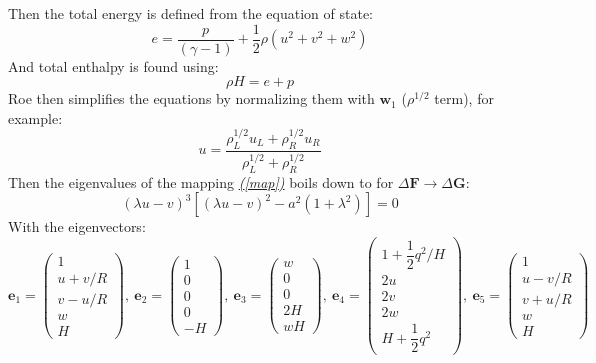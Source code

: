 \documentclass[a4paper, 12pt]{article}
\begin{document}
Then the total energy is defined from the equation of state:
\begin{equation}
    e = \dfrac{p}{(\gamma-1)}+\dfrac{1}{2}\rho(u^2+v^2+w^2)
\end{equation}
And total enthalpy is found using:
\begin{equation}
    \rho H= e+p
\end{equation}
Roe then simplifies the equations by normalizing them with $\textbf{w}_1$ ($\rho^{1/2}$ term), for example:
\begin{equation}
    u = \dfrac{\rho_L^{1/2}u_L+\rho_R^{1/2}u_R}{\rho_L^{1/2}+\rho_R^{1/2}}
\end{equation}
Then the eigenvalues of the mapping \hyperref[map]{\textit{(\autoref{map})}} boils down to for $\Delta\textbf{F}\rightarrow{}\Delta\textbf{G}$:
\begin{equation}
    (\lambda u-v)^3[(\lambda u-v)^2-a^2(1+\lambda^2)] = 0
\end{equation}
With the eigenvectors:
\begin{equation}
    \textbf{e}_1=\begin{pmatrix}
        1\\u+v/R\\v-u/R\\w\\H
    \end{pmatrix},\:
    \textbf{e}_2=\begin{pmatrix}
        1\\0\\0\\0\\-H
    \end{pmatrix},\:
    \textbf{e}_3=\begin{pmatrix}
        w\\0\\0\\2H\\wH
    \end{pmatrix},\:
    \textbf{e}_4=\begin{pmatrix}
        1+\dfrac{1}{2}q^2/H\\2u\\2v\\2w\\H+\dfrac{1}{2}q^2
    \end{pmatrix},\:
    \textbf{e}_5=\begin{pmatrix}
        1\\u-v/R\\v+u/R\\w\\H
    \end{pmatrix}
\end{equation}
\end{document}
